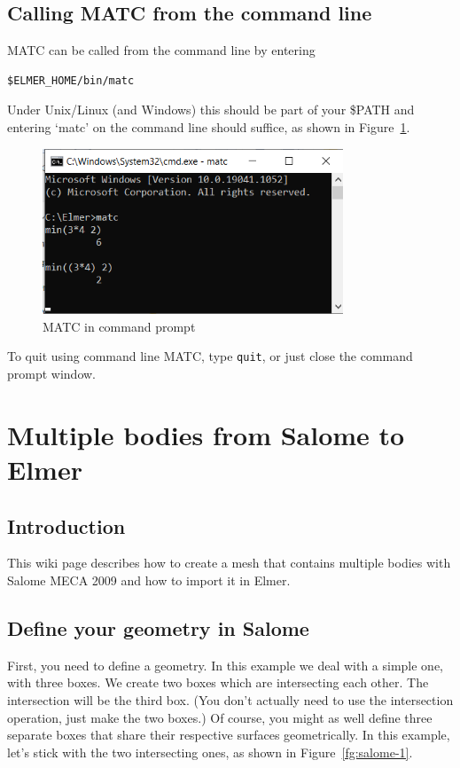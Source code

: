 \subsection{Calling MATC from the command line}

MATC can be called from the command line by entering \begin{verbatim}$ELMER_HOME/bin/matc\end{verbatim} Under Unix/Linux (and Windows) this should be part of your \$PATH and entering `matc' on the command line should suffice, as shown in Figure~\ref{fg:matc}.\\

\begin{figure}[H]
\centering
\includegraphics[width=0.8\textwidth]{matc}
\caption{MATC in command prompt}\label{fg:matc}
\end{figure}

\noindent To quit using command line MATC, type \texttt{quit}, or just close the command prompt window.

\newpage

\section{Multiple bodies from Salome to Elmer}

\subsection{Introduction}

This wiki page describes how to create a mesh that contains multiple bodies with Salome MECA 2009 and how to import it in Elmer.

\subsection{Define your geometry in Salome}

First, you need to define a geometry. In this example we deal with a simple one, with three boxes. We create two boxes which are intersecting each other. The intersection will be the third box. (You don't actually need to use the intersection operation, just make the two boxes.) Of course, you might as well define three separate boxes that share their respective surfaces geometrically. In this example, let's stick with the two intersecting ones, as shown in Figure~\ref{fg:salome-1}. 

